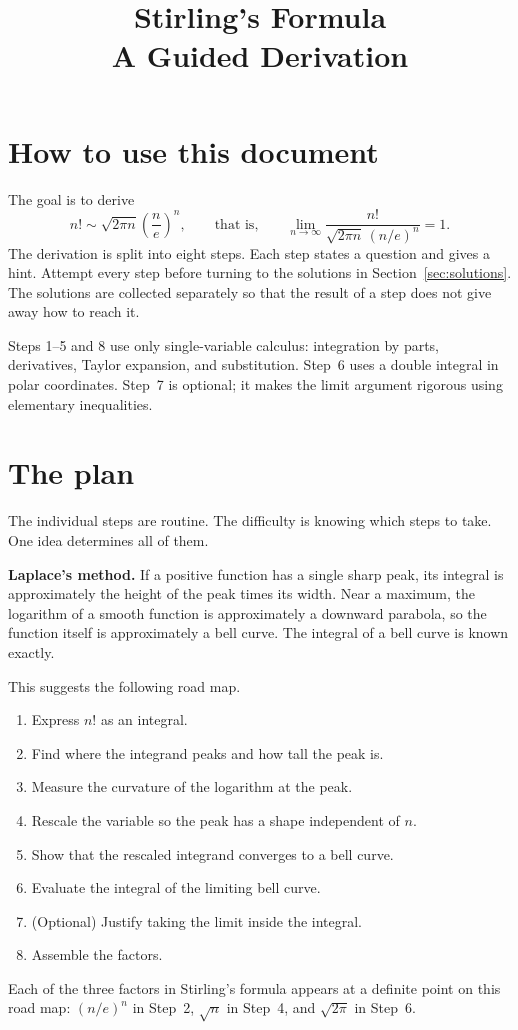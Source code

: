 \documentclass{workbook}
\title{Stirling's Formula\\A Guided Derivation}
\author{}
\date{}
\theoremstyle{step}
\begin{document}
\maketitle

\section*{How to use this document}

The goal is to derive
\[
  n! \sim \sqrt{2\pi n}\left(\frac{n}{e}\right)^{n},
  \qquad\text{that is,}\qquad
  \lim_{n\to\infty}\frac{n!}{\sqrt{2\pi n}\,(n/e)^{n}} = 1 .
\]
The derivation is split into eight steps. Each step states a question and
gives a hint. Attempt every step before turning to the solutions in
Section~\ref{sec:solutions}. The solutions are collected separately so that
the result of a step does not give away how to reach it.

Steps 1--5 and 8 use only single-variable calculus: integration by parts,
derivatives, Taylor expansion, and substitution. Step~6 uses a double
integral in polar coordinates. Step~7 is optional; it makes the limit argument
rigorous using elementary inequalities.

\section{The plan}

The individual steps are routine. The difficulty is knowing which steps to
take. One idea determines all of them.

\medskip
\noindent\textbf{Laplace's method.} If a positive function has a single
sharp peak, its integral is approximately the height of the peak times its
width. Near a maximum, the logarithm of a smooth function is approximately a
downward parabola, so the function itself is approximately a bell curve. The
integral of a bell curve is known exactly.

\medskip
\noindent This suggests the following road map.
\begin{enumerate}
  \item Express $n!$ as an integral.
  \item Find where the integrand peaks and how tall the peak is.
  \item Measure the curvature of the logarithm at the peak.
  \item Rescale the variable so the peak has a shape independent of $n$.
  \item Show that the rescaled integrand converges to a bell curve.
  \item Evaluate the integral of the limiting bell curve.
  \item (Optional) Justify taking the limit inside the integral.
  \item Assemble the factors.
\end{enumerate}
Each of the three factors in Stirling's formula appears at a definite point
on this road map: $(n/e)^n$ in Step~2, $\sqrt{n}$ in Step~4, and
$\sqrt{2\pi}$ in Step~6.
\end{document}
